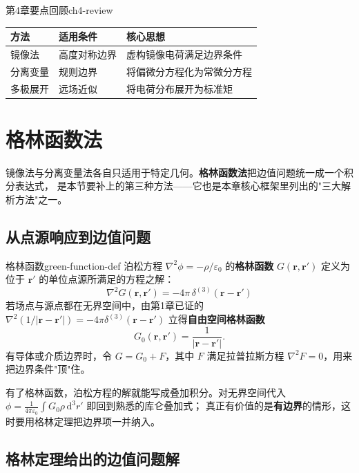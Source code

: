 \documentclass[11pt,a4paper,openany,oneside]{book}
\newcommand{\diff}{\mathrm{d}}
\newcommand{\eps}{\varepsilon}
\newcommand{\vect}[1]{\bm{#1}}
\newcommand{\lap}{\nabla^2}
\begin{document}
\begin{review}{第4章要点回顾}{ch4-review}
\begin{center}
\begin{tabular}{@{}lll@{}}
\toprule
\textbf{方法} & \textbf{适用条件} & \textbf{核心思想} \\
\midrule
镜像法 & 高度对称边界 & 虚构镜像电荷满足边界条件 \\
分离变量 & 规则边界 & 将偏微分方程化为常微分方程 \\
多极展开 & 远场近似 & 将电荷分布展开为标准矩 \\
\bottomrule
\end{tabular}
\end{center}
\end{review}

\section{格林函数法}

镜像法与分离变量法各自只适用于特定几何。\textbf{格林函数法}把边值问题统一成一个积分表达式，
是本节要补上的第三种方法——它也是本章核心框架里列出的"三大解析方法"之一。

\subsection{从点源响应到边值问题}

\begin{definition}{格林函数}{green-function-def}
泊松方程 $\lap\phi = -\rho/\eps_0$ 的\textbf{格林函数} $G(\vect{r},\vect{r}')$
定义为位于 $\vect{r}'$ 的单位点源所满足的方程之解：
\begin{equation}
\lap G(\vect{r},\vect{r}') = -4\pi\,\delta^{(3)}(\vect{r}-\vect{r}')
\label{eq:green-def}
\end{equation}
若场点与源点都在无界空间中，由第1章已证的 $\lap(1/|\vect{r}-\vect{r}'|)
= -4\pi\delta^{(3)}(\vect{r}-\vect{r}')$ 立得\textbf{自由空间格林函数}
\[
G_0(\vect{r},\vect{r}') = \frac{1}{|\vect{r}-\vect{r}'|}.
\]
有导体或介质边界时，令 $G = G_0 + F$，其中 $F$ 满足拉普拉斯方程
$\lap F = 0$，用来把边界条件"顶"住。
\end{definition}

有了格林函数，泊松方程的解就能写成叠加积分。对无界空间代入
$\phi = \frac{1}{4\pi\eps_0}\int G_0 \rho \,\diff^3r'$ 即回到熟悉的库仑叠加式；
真正有价值的是\textbf{有边界}的情形，这时要用格林定理把边界项一并纳入。

\subsection{格林定理给出的边值问题解}
\end{document}
